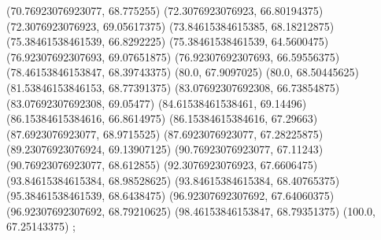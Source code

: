 {{{		(70.76923076923077, 68.775255)
		(72.3076923076923, 66.80194375)
		(72.3076923076923, 69.05617375)
		(73.84615384615385, 68.18212875)
		(75.38461538461539, 66.8292225)
		(75.38461538461539, 64.5600475)
		(76.92307692307693, 69.07651875)
		(76.92307692307693, 66.59556375)
		(78.46153846153847, 68.39743375)
		(80.0, 67.9097025)
		(80.0, 68.50445625)
		(81.53846153846153, 68.77391375)
		(83.07692307692308, 66.73854875)
		(83.07692307692308, 69.05477)
		(84.61538461538461, 69.14496)
		(86.15384615384616, 66.8614975)
		(86.15384615384616, 67.29663)
		(87.6923076923077, 68.9715525)
		(87.6923076923077, 67.28225875)
		(89.23076923076924, 69.13907125)
		(90.76923076923077, 67.11243)
		(90.76923076923077, 68.612855)
		(92.3076923076923, 67.6606475)
		(93.84615384615384, 68.98528625)
		(93.84615384615384, 68.40765375)
		(95.38461538461539, 68.6438475)
		(96.92307692307692, 67.64060375)
		(96.92307692307692, 68.79210625)
		(98.46153846153847, 68.79351375)
		(100.0, 67.25143375)
	};

}}
